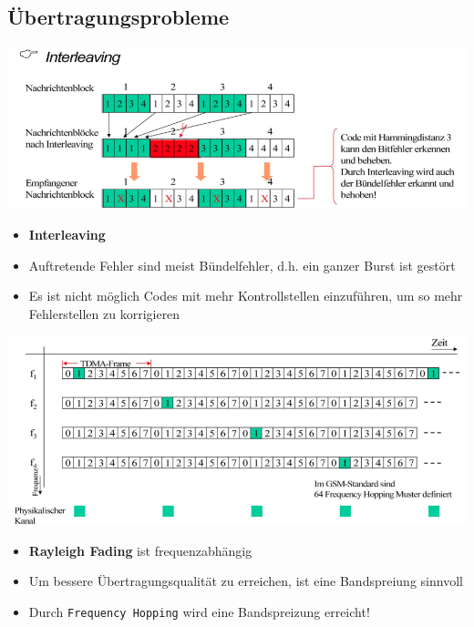 \subsection{Übertragungsprobleme}
\begin{minipage}{0.5 \linewidth}
\includegraphics[width = \linewidth]{./Pics/GSMInterleaving}
\end{minipage}
\begin{minipage}{0.5 \linewidth}
\begin{itemize}
\item \textbf{Interleaving}
\item Auftretende Fehler sind meist Bündelfehler, d.h. ein ganzer Burst ist gestört
\item Es ist nicht möglich Codes mit mehr Kontrollstellen einzuführen, um so mehr Fehlerstellen zu korrigieren
\end{itemize}
\end{minipage}


\begin{minipage}{0.5 \linewidth}
\includegraphics[width = \linewidth]{./Pics/GSMFreqHopping}
\end{minipage}
\begin{minipage}{0.5 \linewidth}
\begin{itemize}
\item \textbf{Rayleigh Fading} ist frequenzabhängig
\item Um bessere Übertragungsqualität zu erreichen, ist eine Bandspreiung sinnvoll
\item Durch \texttt{Frequency Hopping} wird eine Bandspreizung erreicht!
\end{itemize}
\end{minipage}

